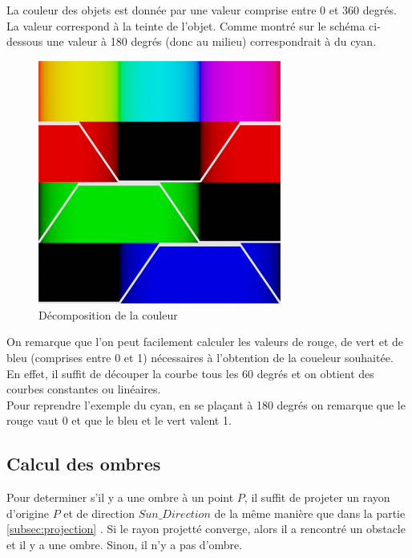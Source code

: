La couleur des objets est donnée par une valeur comprise entre 0 et 360 degrés. La valeur correspond à la teinte de l'objet. Comme montré sur le schéma ci-dessous une valeur à 180 degrés (donc au milieu) correspondrait à du cyan.

\begin{figure}[h]
    \centering
    \includegraphics[width=8cm]{images/huetorgb.jpg}
    \caption{Décomposition de la couleur }\label{fig:huetorb}
\end{figure}

On remarque que l'on peut facilement calculer les valeurs de rouge, de vert et de bleu (comprises entre 0 et 1) nécessaires à l'obtention de la coueleur souhaitée.\\
En effet, il suffit de découper la courbe tous les 60 degrés et on obtient des courbes constantes ou linéaires.\\
Pour reprendre l'exemple du cyan, en se plaçant à 180 degrés on remarque que le rouge vaut 0 et que le bleu et le vert valent 1.
\subsection{Calcul des ombres}
Pour determiner s'il y a une ombre à un point $P$, il suffit de projeter un rayon d'origine $P$ et de direction $Sun\_Direction$ de la même manière que dans la partie \ref{subsec:projection} . Si le rayon projetté converge, alors il a rencontré un obstacle et il y a une ombre. Sinon, il n'y a pas d'ombre.